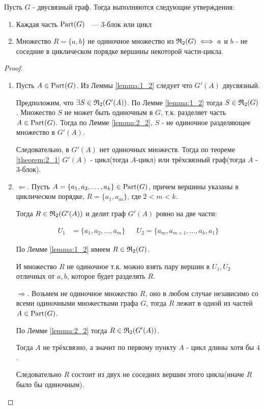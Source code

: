 \begin{customthm}{2.2} \label{theorem:2_2}
	Пусть $G$ - двусвязный граф.
	Тогда выполняются следующие утверждения:

	\begin{enumerate}
		\item Каждая часть $\operatorname{Part}(G)$ ~--- 3-блок или цикл
		\item Множество $R = \{a, b\}$ не одиночное множество из $\mathfrak{R}_2(G) \iff a$ и $b$ - не соседние в циклическом порядке вершины некоторой части-цикла.
	\end{enumerate}

\end{customthm}

\begin{proof}
	\begin{enumerate}
		\item Пусть $A \in \operatorname{Part}(G)$.
			Из Леммы \ref{lemma:1_2} следует что $G'(A)$ двусвязный.

			Предположим, что $\exists S \in \mathfrak{R}_2(G'(A))$.
			По Лемме \ref{lemma:1_2} тогда $S \in \mathfrak{R}_2(G)$.
			Множество $S$ не может быть одиночным в $G$, т.к. разделяет часть $A \in \operatorname{Part}(G)$.
			Тогда по Лемме \ref{lemma:2_2}, $S$ - не одиночное разделяющее множество в  $G'(A)$.

			Следовательно, в  $G'(A)$ нет одиночных множеств.
			Тогда по теореме \ref{theorem:2_1} $G'(A)$ - цикл(тогда $A$-цикл) или трёхсвязный граф(тогда $A$ - 3-блок).

		\item $\Longleftarrow$. Пусть  $A = \{ a_1, a_2, \ldots, a_k \} \in \operatorname{Part}(G)$, причем вершины указаны в циклическом порядке, $R = \{a_1, a_m\}$, где  $2 < m < k$.

			Тогда  $R \in \mathfrak{R}_2(G'(A))$ и делит граф  $G'(A)$ ровно на две части:

			\begin{align*}
				U_1 &= \{a_1, a_2, \ldots, a_m\} && U_2 = \{a_m, a_{m+1}, \ldots, a_k, a_1\}
			\end{align*}

			По Лемме \ref{lemma:1_2} имеем $R \in \mathfrak{R}_2(G)$.

			И множество $R$ не одиночное т.к. можно взять пару вершин в $U_1, U_2$ отличных от $a, b$, которое будет разделять $R$.

			$\Longrightarrow$. Возьмем не одиночное множество $R$, оно в любом случае независимо со всеми одиночными множествами графа  $G$, тогда $R$ лежит в одной из частей $A \in \operatorname{Part}(G)$.

			По Лемме \ref{lemma:2_2} тогда $R \in \mathfrak{R}_2(G'(A))$.

			Тогда $A$ не трёхсвязно, а значит по первому пункту $A$ - цикл длины хотя бы $4$.

			Следовательно  $R$ состоит из двух не соседних вершин этого цикла(иначе $R$ было бы одиночным).

	\end{enumerate}
\end{proof}


